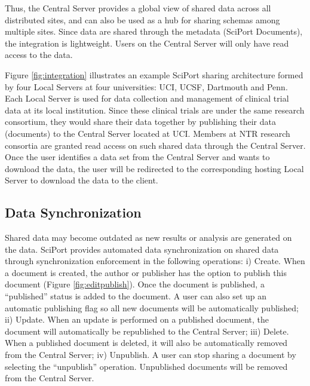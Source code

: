 \documentclass{singlecol-new}
\theoremstyle{TH}{
\newtheorem{lemma}{Lemma}
\newtheorem{theorem}[lemma]{Theorem}
\newtheorem{corrolary}[lemma]{Corrolary}
\newtheorem{conjecture}[lemma]{Conjecture}
\newtheorem{proposition}[lemma]{Proposition}
\newtheorem{claim}[lemma]{Claim}
\newtheorem{stheorem}[lemma]{Wrong Theorem}
\newtheorem{algorithm}{Algorithm}
}
\theoremstyle{THrm}{
\newtheorem{definition}{Definition}[section]
\newtheorem{question}{Question}[section]
\newtheorem{remark}{Remark}
\newtheorem{scheme}{Scheme}
}
\theoremstyle{THhit}{
\newtheorem{case}{Case}[section]
}
\begin{document}
Thus, the Central Server provides a global view of shared data across all
distributed sites, and can also be used as a hub for sharing schemas among
multiple sites. Since data are shared through the metadata (SciPort
Documents), the integration is lightweight. Users on the Central Server will
only have read access to the data.

Figure \ref{fig:integration} illustrates an example SciPort sharing
architecture formed by four Local Servers at four universities: UCI,
UCSF, Dartmouth and Penn. Each Local Server is used for data
collection and management of clinical trial data at its local
institution. Since these clinical trials are under the same research
consortium, they would share their data together by publishing their
data (documents) to the Central Server located at UCI. Members at
NTR research consortia are granted read access on such shared data
through the Central Server. Once the user identifies a data set from
the Central Server and wants to download the data, the user will be
redirected to the corresponding hosting Local Server to download the
data to the client.

\begin{figure*}[t]%
\caption{The Central Server Based Architecture for Data
Sharing}\label{fig:integration}
\end{figure*}

\begin{figure*}[t]%
\caption{An Example of Publishing an Existing Document}
\label{fig:docpublish}
\end{figure*}

\subsection{Data Synchronization}

Shared data may become outdated as new results or analysis are
generated on the data. SciPort provides automated data
synchronization on shared data through synchronization enforcement
in the following operations: i) Create. When a document is created,
the author or publisher has the option to publish this document
(Figure \ref{fig:editpublish}). Once the document is   published, a
``published'' status is added to the document. A user can   also set
up an automatic publishing flag so all new documents will be
automatically published; ii) Update. When an update is performed on
a published document, the document will automatically be republished
to the Central Server; iii) Delete. When a published document is
deleted, it will also be automatically removed from the Central
Server;  iv) Unpublish. A user can stop sharing a document by
selecting the ``unpublish'' operation.  Unpublished documents will
be removed from the Central Server.
\end{document}
